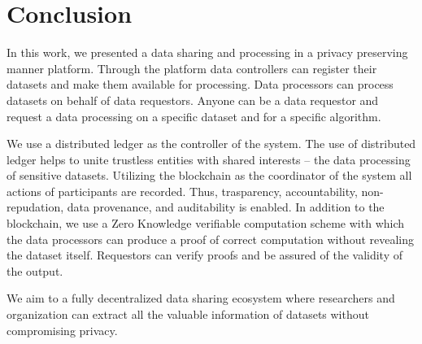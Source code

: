 \chapter{Conclusion}
\label{conclusion}

In this work, we presented a data sharing and processing in a privacy preserving manner platform. Through the platform data controllers can register their datasets and make them available for processing. Data processors can process datasets on behalf of data requestors. Anyone can be a data requestor and request a data processing on a specific dataset and for a specific algorithm.

We use a distributed ledger as the controller of the system. The use of distributed ledger helps to unite trustless entities with shared interests -- the data processing of sensitive datasets. Utilizing the blockchain as the coordinator of the system all actions of participants are recorded. Thus, trasparency, accountability, non-repudation, data provenance, and auditability is enabled. In addition to the blockchain, we use a Zero Knowledge verifiable computation scheme with which the data processors can produce a proof of correct computation without revealing the dataset itself. Requestors can verify proofs and be assured of the validity of the output.

We aim to a fully decentralized data sharing ecosystem where researchers and organization can extract all the valuable information of datasets without compromising privacy.
